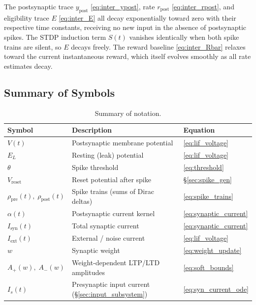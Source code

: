 \documentclass[11pt]{article}
\theoremstyle{definition}
\begin{document}
The postsynaptic trace $y_{\mathrm{post}}$ \eqref{eq:inter_ypost}, rate $r_{\mathrm{post}}$ \eqref{eq:inter_rpost}, and eligibility trace $E$ \eqref{eq:inter_E} all decay exponentially toward zero with their respective time constants, receiving no new input in the absence of postsynaptic spikes. The STDP induction term $S(t)$ vanishes identically when both spike trains are silent, so $E$ decays freely. The reward baseline \eqref{eq:inter_Rbar} relaxes toward the current instantaneous reward, which itself evolves smoothly as all rate estimates decay.

\subsection{Summary of Symbols}

\begin{table}[ht]
\centering
\caption{Summary of notation.}
\label{tab:symbols}
\begin{tabular}{@{}lll@{}}
\toprule
Symbol & Description & Equation \\
\midrule
$V(t)$              & Postsynaptic membrane potential              & \eqref{eq:lif_voltage} \\
$E_L$               & Resting (leak) potential                     & \eqref{eq:lif_voltage} \\
$\theta$            & Spike threshold                              & \eqref{eq:threshold} \\
$V_{\mathrm{reset}}$ & Reset potential after spike                  & \S\ref{sec:spike_gen} \\
$\rho_{\mathrm{pre}}(t),\; \rho_{\mathrm{post}}(t)$ & Spike trains (sums of Dirac deltas) & \eqref{eq:spike_trains} \\
$\alpha(t)$         & Postsynaptic current kernel                  & \eqref{eq:synaptic_current} \\
$I_{\mathrm{syn}}(t)$ & Total synaptic current                     & \eqref{eq:synaptic_current} \\
$I_{\mathrm{ext}}(t)$ & External / noise current                   & \eqref{eq:lif_voltage} \\
$w$                 & Synaptic weight                              & \eqref{eq:weight_update} \\
$A_+(w),\; A_-(w)$  & Weight-dependent LTP/LTD amplitudes          & \eqref{eq:soft_bounds} \\
$I_s(t)$            & Presynaptic input current (\S\ref{sec:input_subsystem}) & \eqref{eq:syn_current_ode} \\

\end{tabular}
\end{table}
\end{document}
